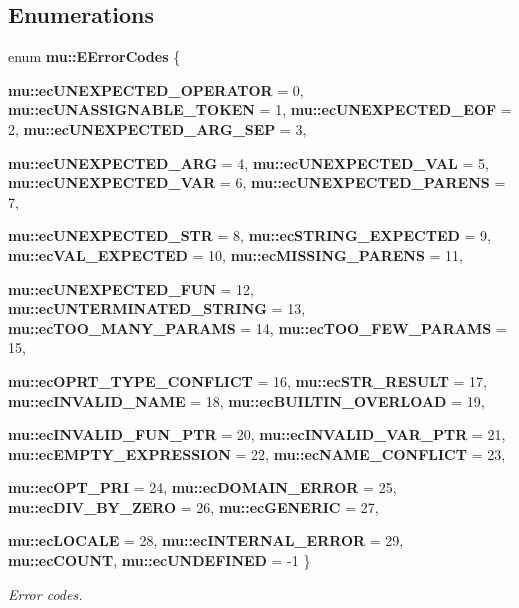 \subsection*{Enumerations}
\begin{CompactItemize}
\item 
enum {\bf mu::EErrorCodes} \{ \par
{\bf mu::ecUNEXPECTED\_\-OPERATOR} =  0, 
{\bf mu::ecUNASSIGNABLE\_\-TOKEN} =  1, 
{\bf mu::ecUNEXPECTED\_\-EOF} =  2, 
{\bf mu::ecUNEXPECTED\_\-ARG\_\-SEP} =  3, 
\par
{\bf mu::ecUNEXPECTED\_\-ARG} =  4, 
{\bf mu::ecUNEXPECTED\_\-VAL} =  5, 
{\bf mu::ecUNEXPECTED\_\-VAR} =  6, 
{\bf mu::ecUNEXPECTED\_\-PARENS} =  7, 
\par
{\bf mu::ecUNEXPECTED\_\-STR} =  8, 
{\bf mu::ecSTRING\_\-EXPECTED} =  9, 
{\bf mu::ecVAL\_\-EXPECTED} =  10, 
{\bf mu::ecMISSING\_\-PARENS} =  11, 
\par
{\bf mu::ecUNEXPECTED\_\-FUN} =  12, 
{\bf mu::ecUNTERMINATED\_\-STRING} =  13, 
{\bf mu::ecTOO\_\-MANY\_\-PARAMS} =  14, 
{\bf mu::ecTOO\_\-FEW\_\-PARAMS} =  15, 
\par
{\bf mu::ecOPRT\_\-TYPE\_\-CONFLICT} =  16, 
{\bf mu::ecSTR\_\-RESULT} =  17, 
{\bf mu::ecINVALID\_\-NAME} =  18, 
{\bf mu::ecBUILTIN\_\-OVERLOAD} =  19, 
\par
{\bf mu::ecINVALID\_\-FUN\_\-PTR} =  20, 
{\bf mu::ecINVALID\_\-VAR\_\-PTR} =  21, 
{\bf mu::ecEMPTY\_\-EXPRESSION} =  22, 
{\bf mu::ecNAME\_\-CONFLICT} =  23, 
\par
{\bf mu::ecOPT\_\-PRI} =  24, 
{\bf mu::ecDOMAIN\_\-ERROR} =  25, 
{\bf mu::ecDIV\_\-BY\_\-ZERO} =  26, 
{\bf mu::ecGENERIC} =  27, 
\par
{\bf mu::ecLOCALE} =  28, 
{\bf mu::ecINTERNAL\_\-ERROR} =  29, 
{\bf mu::ecCOUNT}, 
{\bf mu::ecUNDEFINED} =  -1
 \}
\begin{CompactList}\small\item\em Error codes. \item\end{CompactList}\end{CompactItemize}
